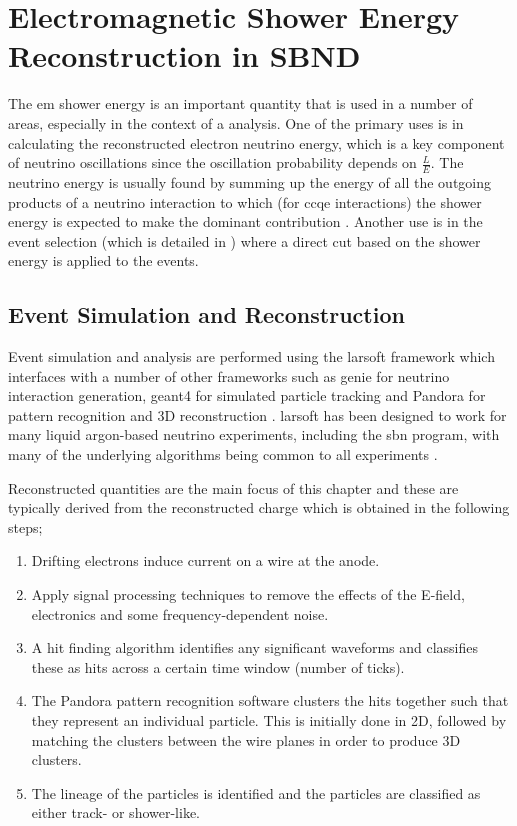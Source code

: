 \chapter{Electromagnetic Shower Energy Reconstruction in SBND}
\label{chap:Energy_Reco}

The \gls{em} shower energy is an important quantity that is used in a number of areas, especially in the context of a \nue analysis. One of the primary uses is in calculating the reconstructed electron neutrino energy, which is a key component of neutrino oscillations since the oscillation probability depends on $\frac{L}{E}$. The neutrino energy is usually found by summing up the energy of all the outgoing products of a neutrino interaction to which (for \nue \gls{ccqe} interactions) the shower energy is expected to make the dominant contribution \cite{neutrino_energy_reconstruction}. Another use is in the \nue event selection (which is detailed in ) where a direct cut based on the shower energy is applied to the events.

\section{Event Simulation and Reconstruction}\label{sec:Event Production and Reconstruction}

Event simulation and analysis are performed using the \gls{larsoft} framework which interfaces with a number of other frameworks such as \gls{genie} for neutrino interaction generation, \gls{geant4} for simulated particle tracking and Pandora for pattern recognition and 3D reconstruction \cite{GENIE}\cite{Geant4_website}\cite{Geant4_paper}\cite{Pandora_paper}. \gls{larsoft} has been designed to work for many liquid argon-based neutrino experiments, including the \gls{sbn} program, with many of the underlying algorithms being common to all experiments \cite{larsoft}\cite{larsoft_paper}.

Reconstructed quantities are the main focus of this chapter and these are typically derived from the reconstructed charge which is obtained in the following steps;
\begin{enumerate}
    \item Drifting electrons induce current on a wire at the anode.
    \item Apply signal processing techniques to remove the effects of the E-field, electronics and some frequency-dependent noise. 
    \item A hit finding algorithm identifies any significant waveforms and classifies these as hits across a certain time window (number of ticks). 
    \item The Pandora pattern recognition software clusters the hits together such that they represent an individual particle. This is initially done in 2D, followed by matching the clusters between the wire planes in order to produce 3D clusters.
    \item The lineage of the particles is identified and the particles are classified as either track- or shower-like.
\end{enumerate}

